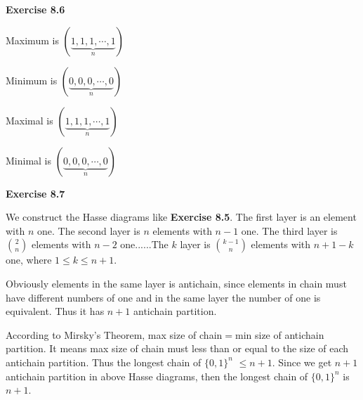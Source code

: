 \documentclass{article} %
\begin{document}
	\textbf{Exercise 8.6}\par
	Maximum is $(\underbrace{1,1,1,\cdots,1}_{n})$\par
	Minimum is $(\underbrace{0,0,0,\cdots,0}_{n})$\par
	Maximal is  $(\underbrace{1,1,1,\cdots,1}_{n})$\par
	Minimal is $(\underbrace{0,0,0,\cdots,0}_{n})$\par
	\textbf{Exercise 8.7}\par
	We construct the Hasse diagrams like \textbf{Exercise 8.5}.
	The first layer is an element with $n$ one. The second layer is $n$ elements with $n-1$ one.
	The third layer is $\binom{2}{n}$ elements with $n-2$ one......The $k$ layer is $\binom{k-1}{n}$ elements with $n+1-k$ one, where $1\leq k\leq n+1$.\par
	Obviously elements in the same layer is antichain, since elements in chain must have different numbers of one and in the same layer the number of one is equivalent.
	Thus it has $n+1$ antichain partition.\par
	According to Mirsky's Theorem, max size of chain$=$min size of antichain partition. It means max size of chain must less than or equal to the size of each antichain partition.
	Thus the longest chain of ${\{0,1\}}^n$ $\leq n+1$. Since we get $n+1$ antichain partition in above Hasse diagrams, then the longest chain of ${\{0,1\}}^n$ is $n+1$.\par
	

	
\end{document}
